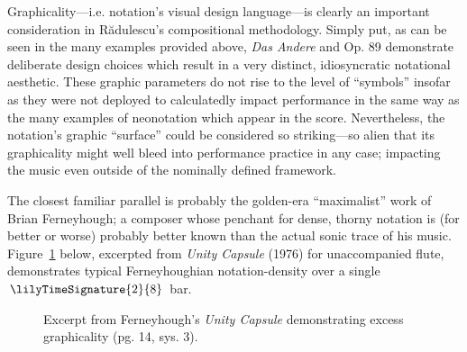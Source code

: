 
        Graphicality---i.e. notation's visual design language---is clearly an important consideration in R\u{a}dulescu's compositional methodology. Simply put, as can be seen in the many examples provided above, \textit{Das Andere} and Op. 89 demonstrate deliberate design choices which result in a very distinct, idiosyncratic notational aesthetic. These graphic parameters do not rise to the level of ``symbols'' insofar as they were not deployed to calculatedly impact performance in the same way as the many examples of neonotation which appear in the score. Nevertheless, the notation's graphic ``surface'' could be considered so striking---so alien that its graphicality might well bleed into performance practice in any case; impacting the music even outside of the nominally defined framework.

        The closest familiar parallel is probably the golden-era ``maximalist'' work of Brian Ferneyhough; a composer whose penchant for dense, thorny notation is (for better or worse) probably better known than the actual sonic trace of his music. Figure~\ref{fig:unitycapsule} below, excerpted from \textit{Unity Capsule} (1976) for unaccompanied flute, demonstrates typical Ferneyhoughian notation-density over a single $\lilyTimeSignature{2}{8}$ bar. 

            \begin{figure} 
                \centering
                \captionsetup{width=.5\textwidth}
                \caption[Excerpt from Ferneyhough's \textit{Unity Capsule} demonstrating excess graphicality (pg. 14, sys. 3).]{Excerpt from Ferneyhough's \textit{Unity Capsule} demonstrating excess graphicality (pg. 14, sys. 3).\footnotemark}
                \label{fig:unitycapsule}
            \end{figure}
                

